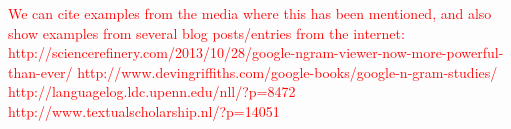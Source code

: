 \documentclass[11pt]{article}
\begin{document}
\textcolor{red}{We can cite examples from the media where this has been mentioned, and also show examples from several blog posts/entries from the internet:
http://sciencerefinery.com/2013/10/28/google-ngram-viewer-now-more-powerful-than-ever/
http://www.devingriffiths.com/google-books/google-n-gram-studies/
http://languagelog.ldc.upenn.edu/nll/?p=8472
http://www.textualscholarship.nl/?p=14051}





\end{document}

